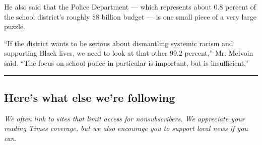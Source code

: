 He also said that the Police Department --- which represents about 0.8
percent of the school district's roughly \$8 billion budget --- is one
small piece of a very large puzzle.

``If the district wants to be serious about dismantling systemic racism
and supporting Black lives, we need to look at that other 99.2
percent,'' Mr. Melvoin said. ``The focus on school police in particular
is important, but is insufficient.''

\begin{center}\rule{0.5\linewidth}{\linethickness}\end{center}

\hypertarget{heres-what-else-were-following}{%
\subsection{Here's what else we're
following}\label{heres-what-else-were-following}}

\emph{We often link to sites that limit access for nonsubscribers. We
appreciate your reading Times coverage, but we also encourage you to
support local news if you can.}

